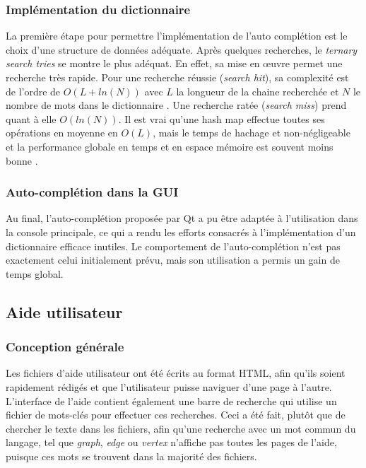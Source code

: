 \documentclass[french]{article}
\begin{document}
			\subsubsection{Implémentation du dictionnaire}
			La première étape pour permettre l'implémentation de l'auto complétion est le choix d'une structure de données adéquate. Après quelques recherches, le \textit{ternary search tries} se montre le plus adéquat. En effet, sa mise en œuvre permet une recherche très rapide. Pour une recherche réussie (\textit{search hit}), sa complexité est de l'ordre de $O(L + ln(N))$ avec $L$ la longueur de la chaine recherchée et $N$ le nombre de mots dans le dictionnaire \cite{tries}. Une recherche ratée (\textit{search miss}) prend quant à elle $O(ln(N))$. Il est vrai qu'une hash map effectue toutes ses opérations en moyenne en $O(L)$, mais le temps de hachage et non-négligeable et la performance globale en temps et en espace mémoire est souvent moins bonne \cite{sedgewick}.
			
			\subsubsection{Auto-complétion dans la GUI}
			Au final, l'auto-complétion proposée par Qt a pu être adaptée à l'utilisation dans la console principale, ce qui a rendu les efforts consacrés à l'implémentation d'un dictionnaire efficace inutiles. Le comportement de l'auto-complétion n'est pas exactement celui initialement prévu, mais son utilisation a permis un gain de temps global.
			
		\subsection{Aide utilisateur}
			\subsubsection{Conception générale}
			Les fichiers d'aide utilisateur ont été écrits au format HTML, afin qu'ils soient rapidement rédigés et que l'utilisateur puisse naviguer d'une page à l'autre. L'interface de l'aide contient également une barre de recherche qui utilise un fichier de mots-clés pour effectuer ces recherches. Ceci a été fait, plutôt que de chercher le texte dans les fichiers, afin qu'une recherche avec un mot commun du langage, tel que \textit{graph}, \textit{edge} ou \textit{vertex} n'affiche pas toutes les pages de l'aide, puisque ces mots se trouvent dans la majorité des fichiers.
	
\end{document}
